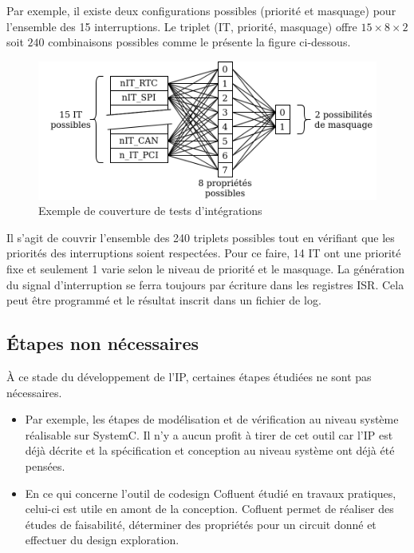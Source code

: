 Par exemple, il existe deux configurations possibles (priorité et masquage) pour l'ensemble des 15 interruptions.
Le triplet (IT, priorité, masquage) offre $15\times8\times2$ soit $240$ combinaisons possibles comme le présente la figure ci-dessous.

\begin{figure}[h!]
	\centering
	\includegraphics[width=0.7\linewidth]{figure/combinaisons_integration.png}
	\caption{Exemple de couverture de tests d'intégrations}
	\label{fig:combinaisons_integration}
\end{figure}

Il s'agit de couvrir l'ensemble des 240 triplets possibles tout en vérifiant que les priorités des interruptions soient respectées. 
Pour ce faire, 14 IT ont une priorité fixe et seulement 1 varie selon le niveau de priorité et le masquage.
La génération du signal d'interruption se ferra toujours par écriture dans les registres ISR.
Cela peut être programmé et le résultat inscrit dans un fichier de log.

\subsection{Étapes non nécessaires}

À ce stade du développement de l'IP, certaines étapes étudiées ne sont pas nécessaires.

\begin{itemize}
	\item Par exemple, les étapes de modélisation et de vérification au niveau système réalisable sur SystemC.
	Il n'y a aucun profit à tirer de cet outil car l'IP est déjà décrite et la spécification et conception au niveau système ont déjà été pensées.
	\item En ce qui concerne l'outil de codesign Cofluent étudié en travaux pratiques, celui-ci est utile en amont de la conception.
	Cofluent permet de réaliser des études de faisabilité, déterminer des propriétés pour un circuit donné et effectuer du design exploration.
\end{itemize}


